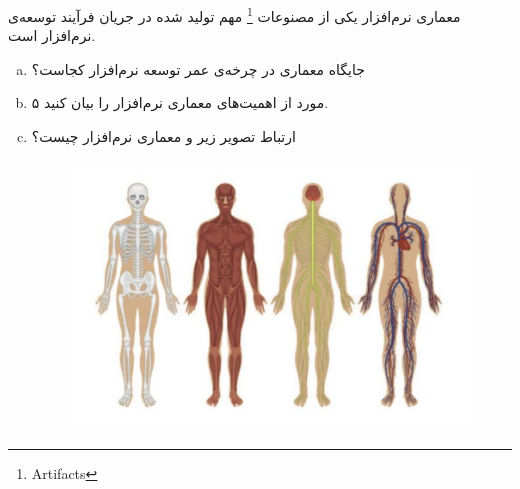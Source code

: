 معماری نرم‌افزار یکی از مصنوعات \footnote{Artifacts} مهم تولید شده در جریان فرآیند توسعه‌ی نرم‌افزار است.

\begin{enumerate}[a)]
	\item 
 جایگاه معماری در چرخه‌ی عمر توسعه نرم‌افزار کجاست؟
	 \item 
۵ مورد از اهمیت‌های معماری نرم‌افزار را بیان کنید.
	\item
ارتباط تصویر زیر و معماری نرم‌افزار چیست؟
\begin{figure}[!ht]
	\centering
	\includegraphics[scale=0.5]{figs/Q4}
\end{figure}
\end{enumerate}


